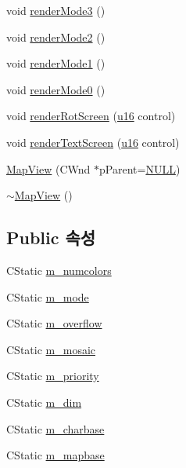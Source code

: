\begin{DoxyCompactItemize}
\item 
void \mbox{\hyperlink{class_map_view_a554841422c2e7d39ed988017561276b1}{render\+Mode3}} ()
\item 
void \mbox{\hyperlink{class_map_view_a4c9cc923e9b7112cfc15887fdec4284d}{render\+Mode2}} ()
\item 
void \mbox{\hyperlink{class_map_view_afcc44b85ee5727fc507a34672a3b6ce4}{render\+Mode1}} ()
\item 
void \mbox{\hyperlink{class_map_view_a03250392fe23753257ed120df86aaea1}{render\+Mode0}} ()
\item 
void \mbox{\hyperlink{class_map_view_a2e462e6466f052427cd894a7c047fa68}{render\+Rot\+Screen}} (\mbox{\hyperlink{_system_8h_a9e6c91d77e24643b888dbd1a1a590054}{u16}} control)
\item 
void \mbox{\hyperlink{class_map_view_acff08c9c182f791799a27592ea7aafff}{render\+Text\+Screen}} (\mbox{\hyperlink{_system_8h_a9e6c91d77e24643b888dbd1a1a590054}{u16}} control)
\item 
\mbox{\hyperlink{class_map_view_ab044e2656406cb180611dd46fa04d9cb}{Map\+View}} (C\+Wnd $\ast$p\+Parent=\mbox{\hyperlink{_system_8h_a070d2ce7b6bb7e5c05602aa8c308d0c4}{N\+U\+LL}})
\item 
\mbox{\hyperlink{class_map_view_a6c3788b3c08e116287872347b3b0e9f6}{$\sim$\+Map\+View}} ()
\end{DoxyCompactItemize}
\subsection*{Public 속성}
\begin{DoxyCompactItemize}
\item 
C\+Static \mbox{\hyperlink{class_map_view_a211ea4eb337579e7193702ed2f20279c}{m\+\_\+numcolors}}
\item 
C\+Static \mbox{\hyperlink{class_map_view_a9d3a6ede0046bc5a24b3472b59594056}{m\+\_\+mode}}
\item 
C\+Static \mbox{\hyperlink{class_map_view_a594a0ff999a2dd22853a45b584325543}{m\+\_\+overflow}}
\item 
C\+Static \mbox{\hyperlink{class_map_view_a382e8904120801584d23def0e73360f9}{m\+\_\+mosaic}}
\item 
C\+Static \mbox{\hyperlink{class_map_view_a3b5211e836b2d9b0124e0bcb71a49c3c}{m\+\_\+priority}}
\item 
C\+Static \mbox{\hyperlink{class_map_view_a78939f6f277c3e2b39292ecd4b21ca00}{m\+\_\+dim}}
\item 
C\+Static \mbox{\hyperlink{class_map_view_ad1561bbb87fe21907a1df6085855d1b1}{m\+\_\+charbase}}
\item 
C\+Static \mbox{\hyperlink{class_map_view_a8f4a820c52aaffadc6132ccd7727aa9d}{m\+\_\+mapbase}}
\end{DoxyCompactItemize}
